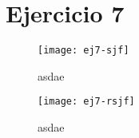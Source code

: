 \section{Ejercicio 7}

\begin{figure}[H]
		\centering
		\texttt{[image: ej7-sjf]}
		\caption{asdae}
		\label{fig:ej7-sjf}
\end{figure}

\begin{figure}[H]
		\centering
		\texttt{[image: ej7-rsjf]}
		\caption{asdae}
		\label{fig:ej7-rsjf}
\end{figure}

